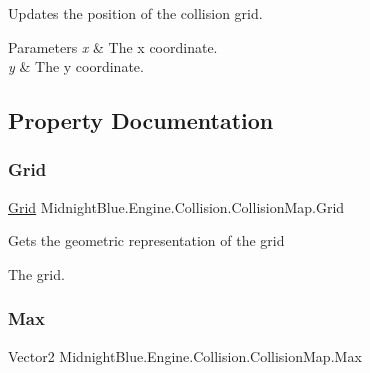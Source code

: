 Updates the position of the collision grid. 


\begin{DoxyParams}{Parameters}
{\em x} & The x coordinate.\\
\hline
{\em y} & The y coordinate.\\
\hline
\end{DoxyParams}


\subsection{Property Documentation}
\hypertarget{class_midnight_blue_1_1_engine_1_1_collision_1_1_collision_map_a4874d2a5ecd291536bed6d32c10cb5e8}{}\label{class_midnight_blue_1_1_engine_1_1_collision_1_1_collision_map_a4874d2a5ecd291536bed6d32c10cb5e8} 
\subsubsection{\texorpdfstring{Grid}{Grid}}
{\footnotesize\ttfamily \hyperlink{class_midnight_blue_1_1_engine_1_1_geometry_1_1_grid}{Grid} Midnight\+Blue.\+Engine.\+Collision.\+Collision\+Map.\+Grid\hspace{0.3cm}{\ttfamily [get]}}



Gets the geometric representation of the grid 

The grid.\hypertarget{class_midnight_blue_1_1_engine_1_1_collision_1_1_collision_map_a98bc019f889435855333b26feb840b20}{}\label{class_midnight_blue_1_1_engine_1_1_collision_1_1_collision_map_a98bc019f889435855333b26feb840b20} 
\subsubsection{\texorpdfstring{Max}{Max}}
{\footnotesize\ttfamily Vector2 Midnight\+Blue.\+Engine.\+Collision.\+Collision\+Map.\+Max\hspace{0.3cm}{\ttfamily [get]}}



